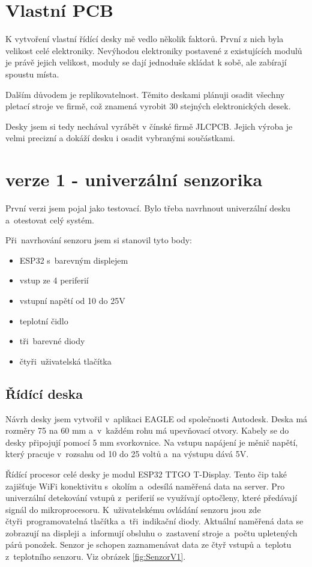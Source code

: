 \section{Vlastní PCB}
K vytvoření vlastní řídící desky mě vedlo několik faktorů. První z nich byla velikost celé elektroniky. 
Nevýhodou elektroniky postavené z existujících modulů je právě jejich velikost, moduly se dají jednoduše skládat k sobě, ale zabírají spoustu místa. 
 
Dalším důvodem je replikovatelnost. Těmito deskami plánuji osadit všechny pletací stroje ve firmě, což znamená vyrobit 30 stejných elektronických desek.

Desky jsem si tedy nechával vyrábět v čínské firmě JLCPCB. Jejich výroba je velmi precizní a dokáží desku i osadit vybranými součástkami.



\section{verze 1 - univerzální senzorika}

První verzi jsem pojal jako testovací. Bylo třeba navrhnout univerzální desku a~otestovat celý systém.\newline

Při~navrhování senzoru jsem si stanovil tyto body:
\begin{itemize}
    \item ESP32 s~barevným displejem
    \item vstup ze 4 periferií
    \item vstupní napětí od 10 do 25V
    \item teplotní čidlo
    \item tři~barevné diody
    \item čtyři~uživatelská tlačítka
\end{itemize}


\subsection{Řídící deska}
Návrh desky jsem vytvořil v~aplikaci EAGLE od společnosti Autodesk. 
Deska má rozměry 75 na 60 mm a~v~každém rohu má upevňovací otvory.
Kabely se do desky připojují pomocí 5 mm svorkovnice.
Na vstupu napájení je měnič napětí, který pracuje v~rozsahu od 10 do 25 voltů a~na výstupu dává 5V. 

Řídící procesor celé desky je modul ESP32 TTGO T-Display.
Tento čip také zajišťuje WiFi konektivitu s~okolím a~odesílá naměřená data na server.
Pro univerzální detekování vstupů z~periferií se využívají optočleny, které předávají signál do mikroprocesoru.
K~uživatelskému ovládání senzoru jsou zde čtyři~programovatelná tlačítka a~tři~indikační diody.
Aktuální naměřená data se zobrazují na displeji a~informují obsluhu o~zastavení stroje a~počtu upletených párů ponožek.
Senzor je schopen zaznamenávat data ze čtyř vstupů a~teplotu z~teplotního senzoru. Viz obrázek \ref{fig:SenzorV1}.

